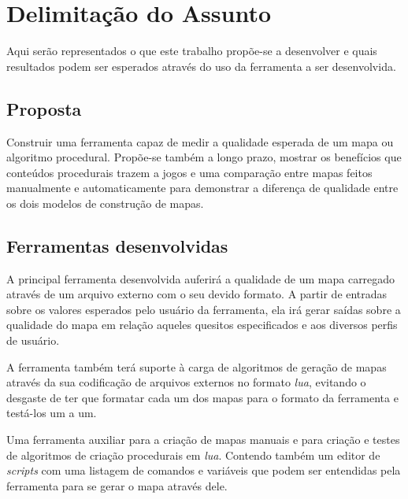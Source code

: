 \chapter[Delimitação do Assunto]{Delimitação do Assunto}

Aqui serão representados o que este trabalho propõe-se a desenvolver e quais resultados podem ser esperados através do uso da ferramenta a ser desenvolvida.

\section{Proposta}

Construir uma ferramenta capaz de medir a qualidade esperada de um mapa ou algoritmo procedural.
Propõe-se também a longo prazo, mostrar os benefícios que conteúdos procedurais trazem a jogos e uma comparação entre mapas feitos manualmente e automaticamente para demonstrar a diferença de qualidade entre os dois modelos de construção de mapas. 

\section{Ferramentas desenvolvidas}

A principal ferramenta desenvolvida auferirá a qualidade de um mapa carregado através de um arquivo externo com o seu devido formato. A partir de entradas sobre os valores esperados pelo usuário da ferramenta, ela irá gerar saídas sobre a qualidade do mapa em relação aqueles quesitos especificados e aos diversos perfis de usuário.

A ferramenta também terá suporte à carga de algoritmos de geração de mapas através da sua codificação de arquivos externos no formato \textit{lua}, evitando o desgaste de ter que formatar cada um dos mapas para o formato da ferramenta e testá-los um a um. 

Uma ferramenta auxiliar para a criação de mapas manuais e para criação e testes de algoritmos de criação procedurais em \textit{lua}. Contendo também um editor de \textit{scripts} com uma listagem de comandos e variáveis que podem ser entendidas pela ferramenta para se gerar o mapa através dele.

